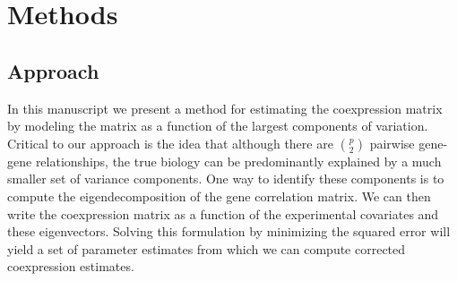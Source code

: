 \section{Methods}

\subsection{Approach}

In this manuscript we present a method for estimating the coexpression
matrix by modeling the matrix as a function of the largest components
of variation. Critical to our approach is the idea that although there
are ${p \choose 2}$ pairwise gene-gene relationships, the true biology
can be predominantly explained by a much smaller set of variance components.
One way to identify these components is to compute the eigendecomposition
of the gene correlation matrix. We can then write the coexpression
matrix as a function of the experimental covariates and these eigenvectors.
Solving this formulation by minimizing the squared error will yield
a set of parameter estimates from which we can compute corrected coexpression
estimates.

